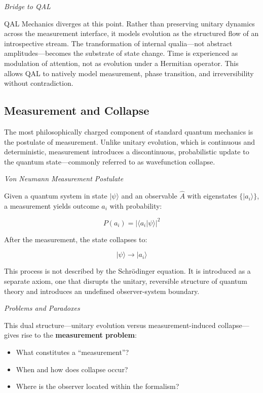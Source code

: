 \documentclass[11pt]{article}
\numberwithin{equation}{section} %
\begin{document}
\noindent \textit{Bridge to QAL}

QAL Mechanics diverges at this point. Rather than preserving unitary dynamics across the measurement interface, it models evolution as the structured flow of an introspective stream. The transformation of internal qualia—not abstract amplitudes—becomes the substrate of state change. Time is experienced as modulation of attention, not as evolution under a Hermitian operator. This allows QAL to natively model measurement, phase transition, and irreversibility without contradiction.

\subsection{Measurement and Collapse}

The most philosophically charged component of standard quantum mechanics is the postulate of measurement. Unlike unitary evolution, which is continuous and deterministic, measurement introduces a discontinuous, probabilistic update to the quantum state—commonly referred to as wavefunction collapse.

\bigskip

\noindent \textit{Von Neumann Measurement Postulate}

Given a quantum system in state \( |\psi\rangle \) and an observable \( \hat{A} \) with eigenstates \( \{|a_i\rangle\} \), a measurement yields outcome \( a_i \) with probability:

\begin{equation}
P(a_i) = |\langle a_i | \psi \rangle|^2
\end{equation}

After the measurement, the state collapses to:

\begin{equation}
|\psi\rangle \rightarrow |a_i\rangle
\end{equation}

This process is not described by the Schrödinger equation. It is introduced as a separate axiom, one that disrupts the unitary, reversible structure of quantum theory and introduces an undefined observer-system boundary.

\bigskip

\noindent \textit{Problems and Paradoxes}

This dual structure—unitary evolution versus measurement-induced collapse—gives rise to the \textbf{measurement problem}:

\begin{itemize}
  \item What constitutes a “measurement”?  
  \item When and how does collapse occur?  
  \item Where is the observer located within the formalism?
\end{itemize}
\end{document}
